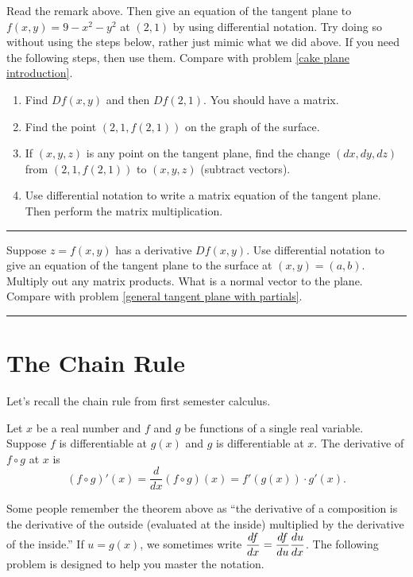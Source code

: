 \begin{problem}
Read the remark above. Then give an equation of the tangent plane to $f(x,y)=9-x^2-y^2$ at $(2,1)$ by using differential notation. Try doing so without using the steps below, rather just mimic what we did above. If you need the following steps, then use them. Compare with problem \ref{cake plane introduction}.
\begin{enumerate}
 \item Find $Df(x,y)$ and then $Df(2,1)$. You should have a matrix.
 \item Find the point $(2,1,f(2,1))$ on the graph of the surface.
 \item If $(x,y,z)$ is any point on the tangent plane, find the change $(dx,dy,dz)$ from $(2,1, f(2,1))$ to $(x,y,z)$ (subtract vectors).
 \item Use differential notation to write a matrix equation of the tangent plane. Then perform the matrix multiplication.
\end{enumerate}
\hrule\end{problem}

\begin{problem}
  Suppose $z=f(x,y)$ has a derivative $Df(x,y)$. Use differential notation to give an equation of the tangent plane to the surface at $(x,y)=(a,b)$. Multiply out any matrix products. What is a normal vector to the plane. Compare with problem \ref{general tangent plane with partials}.
\hrule\end{problem}

\section{The Chain Rule}

Let's recall the chain rule from first semester calculus. 

\begin{theorem}
 Let $x$ be a real number and $f$ and $g$ be functions of a single real variable. Suppose $f$ is differentiable at $g(x)$ and $g$ is differentiable at $x$. The derivative of $f\circ g$ at $x$ is 
$$(f\circ g)'(x) = \frac{d}{dx}(f\circ g)(x) = f'(g(x))\cdot g'(x).$$
\end{theorem}

Some people remember the theorem above as ``the derivative of a composition is the derivative of the outside (evaluated at the inside) multiplied by the derivative of the inside.'' If $u=g(x)$, we sometimes write $\displaystyle \frac{df}{dx}=\frac{df}{du}\frac{du}{dx}$. The following problem is designed to help you master the notation.


